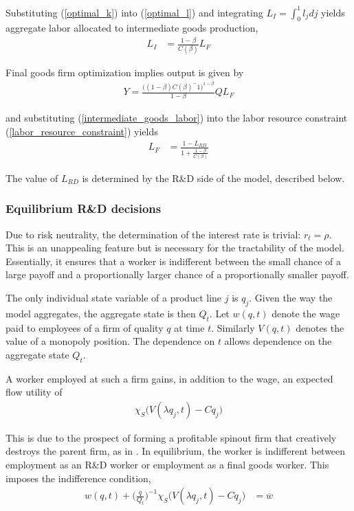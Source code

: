 \documentclass[11pt,english]{article}
\theoremstyle{remark}
\begin{document}
Substituting (\ref{optimal_k}) into (\ref{optimal_l}) and integrating $L_I = \int_0^1 l_j dj$ yields aggregate labor allocated to intermediate goods production,
\begin{align}
	L_I &= \frac{1-\beta}{C(\beta)}L_F \label{intermediate_goods_labor}
\end{align}

Final goods firm optimization implies output is given by 
\begin{align}
	Y = \frac{\Big((1-\beta)C(\beta)^-1\Big)^{1-\beta}}{1-\beta} Q L_F
\end{align}

and substituting (\ref{intermediate_goods_labor}) into the labor resource constraint (\ref{labor_resource_constraint}) yields
\begin{align}
	L_F &= \frac{1 - L_{RD}}{1 + \frac{1-\beta}{C(\beta)}}
\end{align}

The value of $L_{RD}$ is determined by the R\&D side of the model, described below.

\subsubsection{Equilibrium R\&D decisions}

Due to risk neutrality, the determination of the interest rate is trivial: $r_t = \rho$. This is an unappealing feature but is necessary for the tractability of the model. Essentially, it ensures that a worker is indifferent between the small chance of a large payoff and a proportionally larger chance of a proportionally smaller payoff. 

The only individual state variable of a product line $j$ is $q_j$. Given the way the model aggregates, the aggregate state is then $Q_t$. Let $w(q,t)$ denote the wage paid to employees of a firm of quality $q$ at time $t$. Similarly $V(q,t)$ denotes the value of a monopoly position. The dependence on $t$ allows dependence on the aggregate state $Q_t$. 

A worker employed at such a firm gains, in addition to the wage, an expected flow utility of
\begin{align*}
	\chi_S \Big(V(\lambda q_j,t) - Cq_j \Big)
\end{align*}

This is due to the prospect of forming a profitable spinout firm that creatively destroys the parent firm, as in \cite{franco_spin-outs:_2006}. In equilibrium, the worker is indifferent between employment as an R\&D worker or employment as a final goods worker. This imposes the indifference condition,
\begin{align}
	w(q,t) + \Big(\frac{q}{Q_t}\Big)^{-1} \chi_S \Big(V(\lambda q_j,t) - Cq_j \Big) &= \overline{w} \label{simplified_wage_rd}
\end{align}
\end{document}
